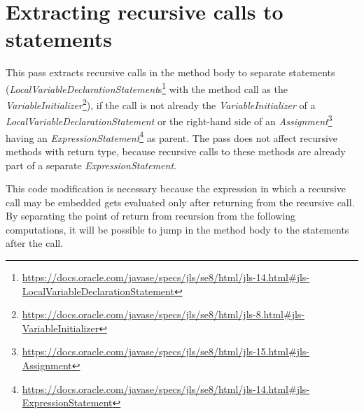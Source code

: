 \section{Extracting recursive calls to statements}

This pass extracts recursive calls in the method body to separate statements
(\textit{LocalVariableDeclarationStatement}s\footnote{\url{https://docs.oracle.com/javase/specs/jls/se8/html/jls-14.html#jls-LocalVariableDeclarationStatement}}
with the method call as the
\textit{VariableInitializer}\footnote{\url{https://docs.oracle.com/javase/specs/jls/se8/html/jls-8.html#jls-VariableInitializer}}),
if the call is not already the \textit{VariableInitializer} of a \textit{LocalVariableDeclarationStatement} or the
right-hand side of an \textit{Assignment}\footnote{\url{https://docs.oracle.com/javase/specs/jls/se8/html/jls-15.html#jls-Assignment}}
having an \textit{ExpressionStatement}\footnote{\url{https://docs.oracle.com/javase/specs/jls/se8/html/jls-14.html#jls-ExpressionStatement}}
as parent. The pass does not affect recursive methods with  return type, because recursive calls to these
methods are already part of a separate \textit{ExpressionStatement}.

This code modification is necessary because the expression in which a recursive call may be embedded gets evaluated
only after returning from the recursive call. By separating the point of return from recursion from the following
computations, it will be possible to jump in the method body to the statements after the call.